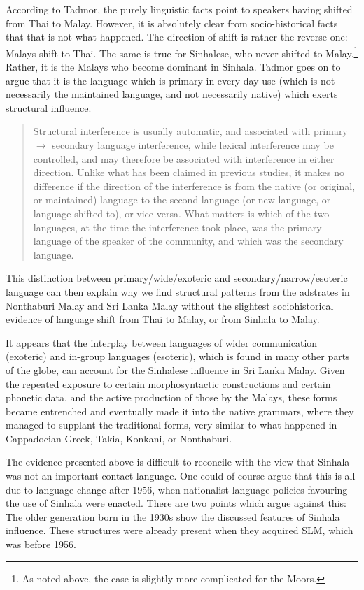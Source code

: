 \documentclass[a4paper,10pt]{article}
\begin{document}
According to Tadmor, the purely linguistic facts point to speakers having shifted from Thai to Malay. However, it is absolutely clear from socio-historical facts that that is not what happened. The direction of shift is rather the reverse one: Malays shift to Thai. The same is true for Sinhalese, who never shifted to Malay.\footnote{As 
 noted above, the case is slightly more complicated for the Moors.
} 
Rather, it is the Malays who become dominant in Sinhala.
Tadmor goes on to argue that it is the language which is primary in every day use (which is not necessarily the maintained language, and not necessarily native) which exerts structural influence.  
\begin{quote}
 Structural interference is usually automatic, and associated with primary $\to$
 secondary language interference, while lexical interference may be controlled, and may therefore be associated with interference in either direction. Unlike what has been claimed in previous studies, it makes no difference if the direction of the interference is from the native (or original, or maintained) language to the second language (or new language, or language shifted to), or vice versa. What matters is which of the two languages, at the time the interference took place, was the primary language of the speaker of the community, and which was the secondary language. \citep[325]{Tadmor1995phd}
\end{quote}

This distinction between primary/wide/exoteric and secondary/narrow/esoteric language can then explain why we find structural patterns from the adstrates in Nonthaburi Malay and Sri Lanka Malay without the slightest sociohistorical evidence of language shift from Thai to Malay, or from Sinhala to Malay. 

It appears that the interplay between languages of wider communication (exoteric) and in-group languages (esoteric), which is found in many other parts of the globe, can account for the Sinhalese influence in Sri Lanka Malay. Given the repeated exposure to certain morphosyntactic constructions and certain phonetic data, and the active production of those by the Malays, these forms became entrenched and eventually made it into the native grammars, where they managed to supplant the traditional forms, very similar to what happened in Cappadocian Greek, Takia, Konkani, or Nonthaburi.

The evidence presented above is difficult to reconcile with the view that Sinhala was not an important contact language. One could of course argue that this is all due to language change after 1956, when nationalist language policies favouring the use of Sinhala were enacted. There are two points which argue against this: The older generation born in the 1930s show the discussed features of Sinhala influence. These structures were already present when they acquired SLM, which was before 1956.
\end{document}
